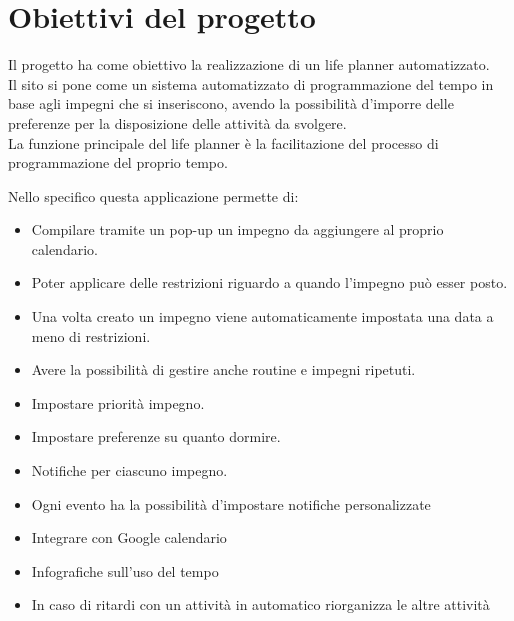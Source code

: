 \section{Obiettivi del progetto}
Il progetto ha come obiettivo la realizzazione di un life planner automatizzato.\\
Il sito si pone come un sistema automatizzato di programmazione del tempo in base agli impegni che si inseriscono, avendo la possibilità d'imporre delle preferenze per la disposizione delle attività da svolgere.\\
La funzione principale del life planner è la facilitazione del processo di programmazione del proprio tempo.

\vspace{0.5cm}

Nello specifico questa applicazione permette di:
\begin{itemize}
    \item Compilare tramite un pop-up un impegno da aggiungere al proprio calendario.
    \item Poter applicare delle restrizioni riguardo a quando l'impegno può esser posto.
    \item Una volta creato un impegno viene automaticamente impostata una data a meno di restrizioni.
    \item Avere la possibilità di gestire anche routine e impegni ripetuti.
    \item Impostare priorità impegno.
    \item Impostare preferenze su quanto dormire.
    \item Notifiche per ciascuno impegno.
    \item Ogni evento ha la possibilità d'impostare notifiche personalizzate
    \item Integrare con Google calendario
    \item Infografiche sull'uso del tempo
    \item In caso di ritardi con un attività in automatico riorganizza le altre attività
\end{itemize}


